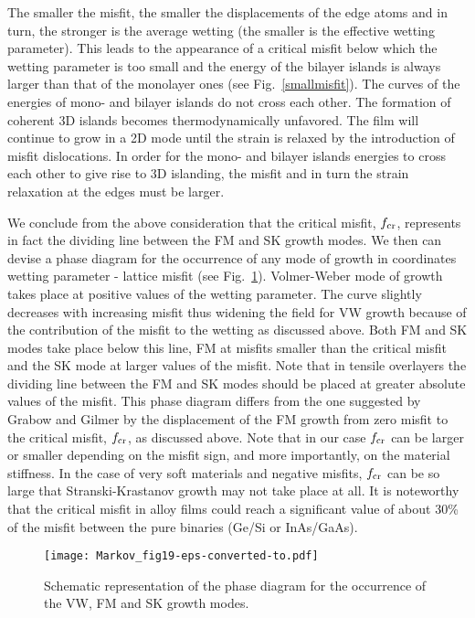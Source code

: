\documentclass[aps,prl,showpacs,twocolumn,byrevtex,floatfix]{revtex4-1}
\begin{document}
The smaller the misfit, the smaller the displacements of the edge atoms and
in turn, the stronger is the average wetting (the smaller is the effective
wetting parameter). This leads to the appearance of a critical misfit
below which the wetting parameter is too small and the energy of the bilayer
islands is always larger than that of the monolayer ones (see Fig.\
\ref{smallmisfit}). The curves of the energies of mono- and bilayer islands
do not cross each other. The formation of coherent 3D islands becomes
thermodynamically unfavored. The film will continue to grow in a 2D mode until
the strain is relaxed by the introduction of misfit dislocations. In order for
the mono- and bilayer islands energies to cross each other to give rise to 3D
islanding, the misfit and in turn the strain relaxation at the edges must 
be larger.

We conclude from the above consideration that the critical misfit, $f_{\rm
cr}$, represents in fact the dividing line between the FM and SK growth modes. 
We then can devise a phase diagram for the occurrence of any mode of growth in
coordinates wetting parameter - lattice misfit (see Fig.\ \ref{phase_diagram}).
Volmer-Weber mode of growth takes place at positive values of the wetting
parameter. The curve slightly decreases with increasing misfit thus
widening the field for VW growth because of the contribution of the misfit to
the wetting as discussed above. Both FM and SK modes take place below this line,
FM at misfits smaller than the critical misfit and the SK mode at larger 
values of the misfit. 
Note that in tensile overlayers the dividing line between the FM
and SK modes should be placed at greater absolute values of the misfit. This
phase diagram differs from the one suggested by Grabow and Gilmer\cite{Grabow88}
by the displacement of the FM growth from zero misfit to the critical misfit,
$f_{\rm cr}$, as discussed above. Note that in our case $f_{\rm cr}$ can be
larger or smaller depending on the misfit sign, and more importantly, on the
material stiffness. In the case of very soft materials and negative misfits,
$f_{\rm cr}$ can be so large that Stranski-Krastanov growth may not take place
at all. It is noteworthy that the critical misfit in alloy films could reach 
a significant value of about 30\% of the misfit between the pure binaries 
(Ge/Si or InAs/GaAs).

\begin{figure}[htb]
\texttt{[image: Markov\_fig19-eps-converted-to.pdf]}
\caption{\label{phase_diagram} Schematic representation of the phase diagram
for the occurrence of the VW, FM and SK growth modes.}
\end{figure}
\end{document}
